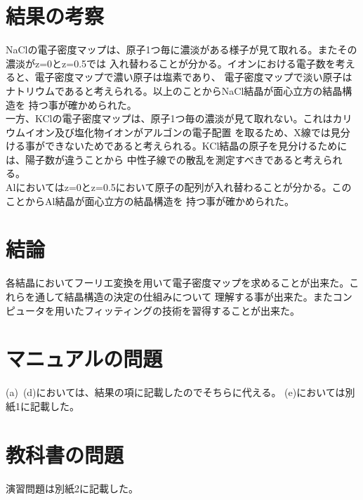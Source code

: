 \documentclass[a4paper,12pt]{jarticle}
\begin{document}
\section{結果の考察}
 NaClの電子密度マップは、原子1つ毎に濃淡がある様子が見て取れる。またその濃淡がz=0とz=0.5では
 入れ替わることが分かる。イオンにおける電子数を考えると、電子密度マップで濃い原子は塩素であり、
 電子密度マップで淡い原子はナトリウムであると考えられる。以上のことからNaCl結晶が面心立方の結晶構造を
 持つ事が確かめられた。\\
  一方、KClの電子密度マップは、原子1つ毎の濃淡が見て取れない。これはカリウムイオン及び塩化物イオンがアルゴンの電子配置
 を取るため、X線では見分ける事ができないためであると考えられる。KCl結晶の原子を見分けるためには、陽子数が違うことから
 中性子線での散乱を測定すべきであると考えられる。\\
  Alにおいてはz=0とz=0.5において原子の配列が入れ替わることが分かる。このことからAl結晶が面心立方の結晶構造を
 持つ事が確かめられた。
  

\section{結論}
 各結晶においてフーリエ変換を用いて電子密度マップを求めることが出来た。これらを通して結晶構造の決定の仕組みについて
 理解する事が出来た。またコンピュータを用いたフィッティングの技術を習得することが出来た。

\section{マニュアルの問題}
 (a)~(d)においては、結果の項に記載したのでそちらに代える。
 (e)においては別紙1に記載した。
 
\section{教科書の問題}
 演習問題は別紙2に記載した。
 
\end{document}
